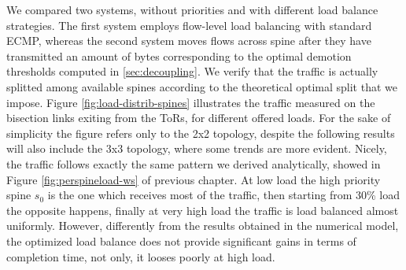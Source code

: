 We compared two systems, without priorities and with different load balance strategies. The first system employs flow-level load balancing with standard ECMP, whereas the second system moves flows across spine after they have transmitted an amount of bytes corresponding to the optimal demotion thresholds computed in \ref{sec:decoupling}. We verify that the traffic is actually splitted among available spines according to the theoretical optimal split that we impose. Figure \ref{fig:load-distrib-spines} illustrates the traffic measured on the bisection links exiting from the ToRs, for different offered loads. For the sake of simplicity the figure refers only to the 2x2 topology, despite the following results will also include the 3x3 topology, where some trends are more evident. Nicely, the traffic follows exactly the same pattern we derived analytically, showed in Figure \ref{fig:perspineload-ws} of previous chapter. At low load the high priority spine $s_0$ is the one which receives most of the traffic, then starting from 30\% load the opposite happens, finally at very high load the traffic is load balanced almost uniformly. However, differently from the results obtained in the numerical model, the optimized load balance does not provide significant gains in terms of completion time, not only, it looses poorly at high load.
